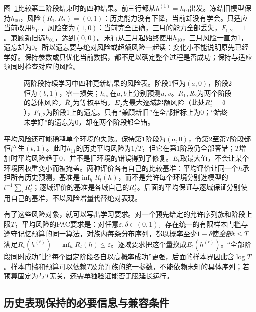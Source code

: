 图~\ref{fig:lt9-continual-four-classifiers}比较第二阶段结束时的四种结果。前三行都从$h^{(1)}=h_{00}$出发。冻结旧模型保持$h_{00}$，风险$(R_1,R_2)=(0,1)$：历史能力没有下降，当前却没有学会。只适应当前改用$h_{11}$，风险变为$(1,0)$：当前完全正确，三月的能力全部丢失，$F_{1,2}=1$。兼顾新旧选$h_{01}$，达到$(0,0)$。末行从三月起始终使用$h_{10}$，三月风险一直为1，遗忘却为0。所以遗忘要与绝对风险或超额风险一起读：变化小不能说明原先已经学好。保持参数或只优化当前数据，都不足以确定整个过程是否成功；保持与适应须同时检查对应的风险。

\begin{figure}[htbp]
 \centering
 
 \caption{两阶段持续学习中四种更新结果的风险表。阶段1恒为$(a,0)$，阶段2恒为$(b,1)$，零一损失；$h_{uv}$在$a,b$上分别预测$u,v$。$R_1,R_2$为两个阶段的总体风险，$\overline R_2$为等权平均，$E_2$为最大逐域超额风险（此处$R_i^\star=0$），$F_{1,2}$为阶段1上的遗忘。只有“兼顾新旧”在全部指标上为0；“始终未学好”的遗忘为0，却在两个阶段都全错。}
 \label{fig:lt9-continual-four-classifiers}
\end{figure}

平均风险还可能稀释单个环境的失败。保持第1阶段为$(a,0)$，令第2至第$T$阶段都恒产生$(b,1)$。此时$h_{11}$的历史平均风险为$1/T$，但它在第1阶段仍全部答错；$T$增加时平均风险趋于0，并不是旧环境的错误得到了修复。$E_t$取最大值，不会让某个环境因权重变小而被掩盖。两种评价各有自己的比较基准：平均评价让同一个$h$承担所有历史预测，基准是$\inf_h\overline R_t(h)$，而不是允许每个环境分别选模型的$t^{-1}\sum_iR_i^\star$；逐域评价的基准是各域自己的$R_i^\star$。后面的平均保证与逐域保证分别使用自己的基准，不以风险增量代替绝对表现。

有了这些风险对象，就可以写出学习要求。对一个预先给定的允许序列族和阶段上限$T$，平均风险的PAC要求是：对任意$\varepsilon,\delta\in(0,1)$，存在统一的有限样本门槛与遵守记忆预算的同一算法，对族内每条分布序列，都以概率至少$1-\delta$使\emph{全部}$t\leq T$满足$\overline R_t(h^{(t)})-\inf_h\overline R_t(h)\leq\varepsilon$。逐域要求把这个量换成$E_t(h^{(t)})$。“全部阶段同时成功”比“每个固定阶段各自以高概率成功”更强，后面的样本界因此含$\log T$。样本门槛和预算可以依赖$T$及允许族的统一参数，不能依赖未知的具体序列；若预算固定为与$T$无关，还需单独验证能否无限延长运行。

\subsection{历史表现保持的必要信息与兼容条件}
\label{sec:continual-conditions}

